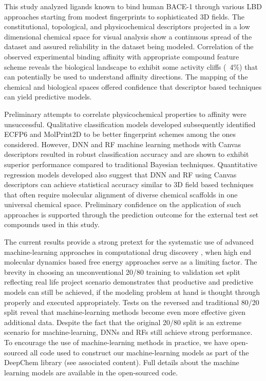 This study analyzed ligands known to bind human BACE-1 through various LBD approaches starting from modest fingerprints to sophisticated 3D fields.  The constitutional, topological, and physicochemical descriptors projected in a low dimensional chemical space for visual analysis show a continuous spread of the dataset and assured reliability in the dataset being modeled.  Correlation of the observed experimental binding affinity with appropriate compound feature scheme reveals the biological landscape to exhibit some activity cliffs (~4\%) that can potentially be used to understand affinity directions.  The mapping of the chemical and biological spaces offered confidence that descriptor based techniques can yield predictive models.  

Preliminary attempts to correlate physicochemical properties to affinity were unsuccessful.  Qualitative classification models developed subsequently identified ECFP6 and MolPrint2D to be better fingerprint schemes among the ones considered.  However, DNN and RF machine learning methods with Canvas descriptors resulted in robust classification accuracy and are shown to exhibit superior performance compared to traditional Bayesian techniques. Quantitative regression models developed also suggest that DNN and RF using Canvas descriptors can achieve statistical accuracy similar to 3D field based techniques that often require molecular alignment of diverse chemical scaffolds in one universal chemical space.  Preliminary confidence on the application of such approaches is supported through the prediction outcome for the external test set compounds used in this study.  

The current results provide a strong pretext for the systematic use of advanced machine-learning approaches in computational drug discovery \cite{xu2015deep, gawehn2016deep, mamoshina2016applications}, when high end molecular dynamics based free energy approaches serve as a limiting factor.  The brevity in choosing an unconventional 20/80 training to validation set split reflecting real life project scenario demonstrates that productive and predictive models can still be achieved, if the modeling problem at hand is thought through properly and executed appropriately.  
Tests on the reversed and traditional 80/20 split reveal that machine-learning methods become even more effective given additional data. Despite the fact that the original 20/80 split is an extreme scenario for machine-learning, DNNs and RFs still achieve strong performance. To encourage the use of machine-learning methods in practice, we have open-sourced all code used to construct our machine-learning models as part of the DeepChem library (see associated content).  Full details about the machine learning models are available in the open-sourced code.

